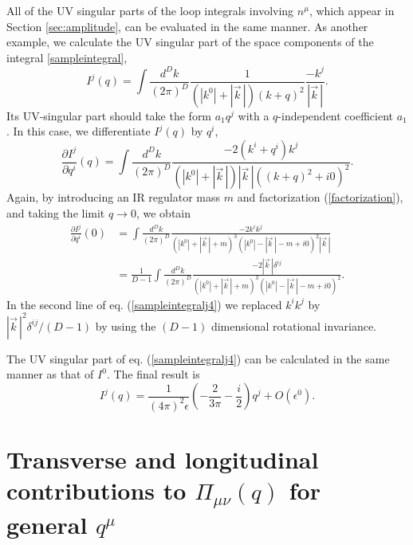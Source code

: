 \documentclass[preprint,amsmath,amssymb,superscriptaddress, floatfix,nofootinbib]{revtex4}
\begin{document}
All of the UV singular parts of the loop integrals 
involving $n^{\mu}$, which appear in Section 
\ref{sec:amplitude}, can be evaluated 
in the same manner. As another example, 
we calculate the UV singular part of 
the space components of the 
integral \eqref{sampleintegral}, 
\begin{equation}
I^j(q)= \int \frac{d^D k}{(2\pi)^D} \frac{ 1 }{ 
(|k^0|+|\vec{k}\,|) (k+q)^2 }
\frac{-k^j}{|\vec{k}\,|}  . 
\label{sampleintegralj}
\end{equation}
Its UV-singular part 
should take the form $a_1q^j$ with a $q$-independent coefficient $a_1$. 
In this case, we differentiate $I^j(q)$ by $q^i$, 
\begin{equation}
\frac{\partial I^j}{\partial q^i} (q) = \int \frac{d^D k}{(2\pi)^D} 
\frac{ -2(k^i+q^i) k^j  }
{  (|k^0|+|\vec{k}\,|) |\vec{k}\,| ((k+q)^2 + i0)^2 } .
\label{sampleintegraj3}
\end{equation}
Again, by introducing an IR regulator mass $m$ and 
factorization (\ref{factorization}), and 
taking the limit $q\to 0$,  we obtain 
\begin{align}
\frac{\partial I^j}{\partial q^i} (0) & = \int \frac{d^D k}{(2\pi)^D} 
\frac{ -2 k^i k^j  }
{  (|k^0|+|\vec{k}\,|+m)^3 ( |k^0| -|\vec{k}\,|-m + i0)^2 |\vec{k}\,| }
\nonumber \\
& =  \frac{1}{D-1} \int \frac{d^D k}{(2\pi)^D} 
\frac{ -2 |\vec{k}\,| \delta^{ij}  }
{  (|k^0|+|\vec{k}\,|+m)^3 ( |k^0| -|\vec{k}\,|-m + i0)^2 } .
\label{sampleintegralj4}
\end{align}
In the second line of eq. (\ref{sampleintegralj4}) we replaced 
$k^ik^j$ by $|\vec{k}\,|^2 \delta^{ij}/(D-1)$ by using the $(D-1)$ dimensional rotational invariance. 

The UV singular part of eq. (\ref{sampleintegralj4}) can be calculated 
in the same manner as that of $I^0$. 
The final result is 
%
\begin{equation}
I^j(q) = \frac{1}{(4\pi)^2\epsilon}\left( -\frac{2}{3\pi}- \frac{i}{2} \right) q^j 
+O(\epsilon^0) .
\end{equation}

\section{Transverse and longitudinal contributions to $\Pi_{\mu\nu}(q)$ 
for general $q^{\mu}$ }
\label{sec:AppB}

\end{document}
